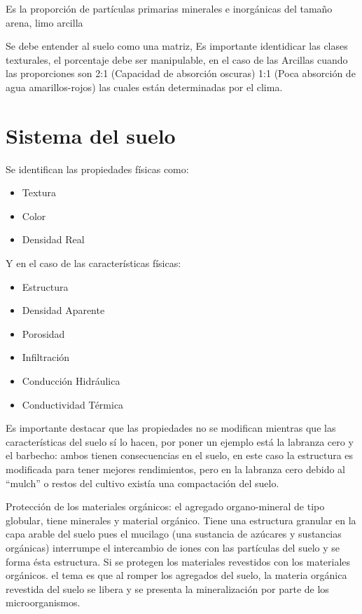 
\begin{definition}[Textura]
    Es la proporción de partículas primarias minerales e inorgánicas del tamaño arena, limo arcilla
\end{definition}

Se debe entender al suelo como una matriz, Es importante identidicar 
las clases texturales, el porcentaje debe ser manipulable, en el caso de las Arcillas
cuando las proporciones son 2:1 (Capacidad de absorción oscuras) 1:1 (Poca absorción de agua amarillos-rojos) las cuales están determinadas por el clima.

\section{Sistema del suelo}
Se identifican las propiedades físicas como:
\begin{itemize}
    \item Textura
    \item Color
    \item Densidad Real
\end{itemize}
Y en el caso de las características físicas:
\begin{itemize}
    \item Estructura
    \item Densidad Aparente
    \item Porosidad
    \item Infiltración
    \item Conducción Hidráulica
    \item Conductividad Térmica
\end{itemize}

Es importante destacar que las propiedades no se modifican mientras que las características del suelo sí lo hacen, por poner un ejemplo está la labranza cero y el barbecho: ambos tienen consecuencias en el suelo, en este caso la estructura es modificada para tener mejores rendimientos, pero en la labranza cero debido al ``mulch'' o restos del cultivo existía una compactación del suelo.

Protección de los materiales orgánicos: el agregado organo-mineral de tipo globular, tiene minerales y material orgánico. Tiene una estructura granular en la capa arable del suelo pues el mucilago (una sustancia de azúcares y sustancias orgánicas) interrumpe el intercambio de iones con las partículas del suelo y se forma ésta estructura.
Si se protegen los materiales revestidos con los materiales orgánicos. el tema es que al romper los agregados del suelo, la materia orgánica revestida del suelo se libera y se presenta la mineralización por parte de los microorganismos.

